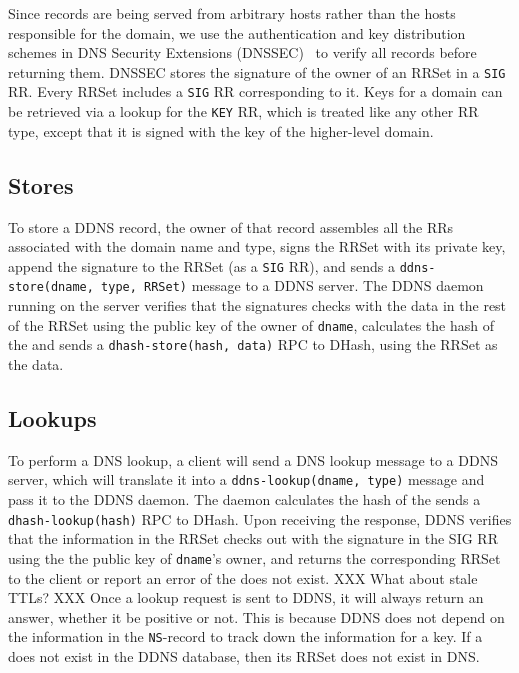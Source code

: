 Since records are being served from arbitrary hosts rather
than the hosts responsible for the domain, 
we use the authentication and key distribution schemes in 
DNS Security Extensions (DNSSEC)~\cite{dnssec:rfc} to
verify all records before returning them. DNSSEC stores the 
signature of the owner of an RRSet in a {\tt SIG} RR. Every RRSet
includes a {\tt SIG} RR corresponding to it. Keys for a domain can 
be retrieved via a lookup for the {\tt KEY} RR, which is treated 
like any other RR type, except that it is signed with the 
key of the higher-level domain.

\subsection{Stores}

To store a DDNS record, the owner of that record 
assembles all the RRs associated with the domain name and type, 
signs the RRSet with its private key, append the signature to 
the RRSet (as a {\tt SIG} RR),
and sends a {\tt ddns-store(dname, type, RRSet)} message to a 
DDNS server.
The DDNS daemon running on the server verifies that 
the signatures checks with the data in the 
rest of the RRSet using the public key of the owner of {\tt dname},
calculates the hash of the {\tt <dname, type>} and sends
a {\tt dhash-store(hash, data)} RPC to DHash, using the
RRSet as the data. 

\subsection{Lookups}

To perform a DNS lookup, a client will send a 
DNS lookup message to a DDNS server, which will 
translate it into a
{\tt ddns-lookup(dname, type)} message and pass it 
to the DDNS daemon.
The daemon 
calculates the hash of the {\tt <dname, type>} sends a
{\tt dhash-lookup(hash)} RPC to DHash. Upon receiving
the response, DDNS verifies that the information in the RRSet 
checks out with the signature in the SIG RR using the 
the public key of {\tt dname}'s owner, and
returns the corresponding RRSet to the 
client or report an error of the {\tt <dname, type>} does 
not exist. XXX What about stale TTLs? XXX
Once a lookup request is sent to DDNS, it will 
always return an answer, whether it be positive or not. 
This is because DDNS does not depend on the information 
in the {\tt NS}-record to track down the information for a key.
If a {\tt <dname, type>} does not exist in the DDNS database,
then its RRSet does not exist in DNS. 

